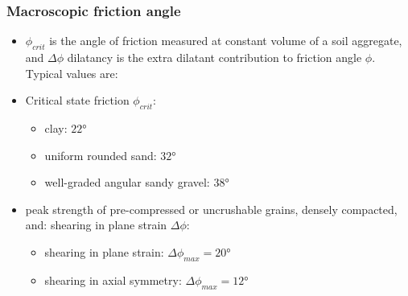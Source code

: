 \documentclass[notes]{beamer}
\begin{document}
\begin{frame}
	\frametitle{Macroscopic friction angle}
	\begin{itemize}
		\item $\phi_{crit}$ is the angle of friction measured at constant volume of a soil
		aggregate, and $\Delta \phi$ dilatancy is the extra dilatant contribution to
		friction angle $\phi$. Typical values are:
		\item Critical state friction $\phi_{crit}$:
		\begin{itemize}
			\item clay: $\ang{22}$
			\item uniform rounded sand: $\ang{32}$
			\item well-graded angular sandy gravel: $\ang{38}$
		\end{itemize}
		\item peak strength of pre-compressed or uncrushable grains, densely compacted, and:
		shearing in plane strain $\Delta \phi$:
		\begin{itemize}
			\item shearing in plane strain: $\Delta \phi_{max} = \ang{20}$
			\item shearing in axial symmetry: $\Delta \phi_{max} = \ang{12}$
		\end{itemize}
	\end{itemize}
\end{frame}
\end{document}

